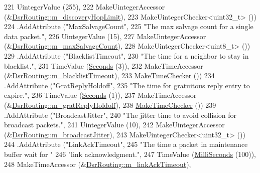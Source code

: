 \begin{DoxyCode}
221                    UintegerValue (255),
222                    MakeUintegerAccessor (&\hyperlink{classns3_1_1dsr_1_1DsrRouting_acf9cc5a2ae446403b8b57f3340fac178}{DsrRouting::m\_discoveryHopLimit}),
223                    MakeUintegerChecker<uint32\_t> ())
224     .AddAttribute (\textcolor{stringliteral}{"MaxSalvageCount"},
225                    \textcolor{stringliteral}{"The max salvage count for a single data packet."},
226                    UintegerValue (15),
227                    MakeUintegerAccessor (&\hyperlink{classns3_1_1dsr_1_1DsrRouting_a89f7e66d9f1bd83433b004876acf4a45}{DsrRouting::m\_maxSalvageCount}),
228                    MakeUintegerChecker<uint8\_t> ())
229     .AddAttribute (\textcolor{stringliteral}{"BlacklistTimeout"},
230                    \textcolor{stringliteral}{"The time for a neighbor to stay in blacklist."},
231                    TimeValue (\hyperlink{group__timecivil_ga33c34b816f8ff6628e33d5c8e9713b9e}{Seconds} (3)),
232                    MakeTimeAccessor (&\hyperlink{classns3_1_1dsr_1_1DsrRouting_a07022fdee22444ddb4560c1f78bccaf2}{DsrRouting::m\_blacklistTimeout}),
233                    \hyperlink{group__time_ga7032965bd4afa578691d88c09e4481c1}{MakeTimeChecker} ())
234     .AddAttribute (\textcolor{stringliteral}{"GratReplyHoldoff"},
235                    \textcolor{stringliteral}{"The time for gratuitous reply entry to expire."},
236                    TimeValue (\hyperlink{group__timecivil_ga33c34b816f8ff6628e33d5c8e9713b9e}{Seconds} (1)),
237                    MakeTimeAccessor (&\hyperlink{classns3_1_1dsr_1_1DsrRouting_a43f5d8b4569f2122788518584ce3ae77}{DsrRouting::m\_gratReplyHoldoff}),
238                    \hyperlink{group__time_ga7032965bd4afa578691d88c09e4481c1}{MakeTimeChecker} ())
239     .AddAttribute (\textcolor{stringliteral}{"BroadcastJitter"},
240                    \textcolor{stringliteral}{"The jitter time to avoid collision for broadcast packets."},
241                    UintegerValue (10),
242                    MakeUintegerAccessor (&\hyperlink{classns3_1_1dsr_1_1DsrRouting_afb77e13fc791e5076ee1f8595b9c6617}{DsrRouting::m\_broadcastJitter}),
243                    MakeUintegerChecker<uint32\_t> ())
244     .AddAttribute (\textcolor{stringliteral}{"LinkAckTimeout"},
245                    \textcolor{stringliteral}{"The time a packet in maintenance buffer wait for "}
246                    \textcolor{stringliteral}{"link acknowledgment."},
247                    TimeValue (\hyperlink{group__timecivil_gaf26127cf4571146b83a92ee18679c7a9}{MilliSeconds} (100)),
248                    MakeTimeAccessor (&\hyperlink{classns3_1_1dsr_1_1DsrRouting_ace1671263c7f09cd2523f1c81dc41631}{DsrRouting::m\_linkAckTimeout}),

\end{DoxyCode}
